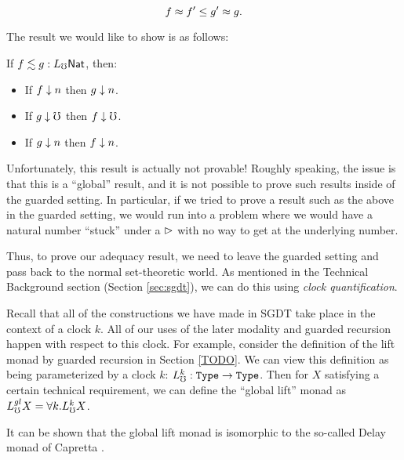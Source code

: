 \[ f \approx f' \le g' \approx g. \]

The result we would like to show is as follows:
\begin{lemma}
If $f \lesssim g : L_\mho \mathsf{Nat}$, then:
\begin{itemize}
  \item If $f \downarrow n$ then $g \downarrow n$.
  \item If $g \downarrow \mho$ then $f \downarrow \mho$.
  \item If $g \downarrow n$ then $f \downarrow n$.
\end{itemize}
\end{lemma}

Unfortunately, this result is actually not provable!
Roughly speaking, the issue is that this is a ``global'' result, and it is not possible
to prove such results inside of the guarded setting. 
In particular, if we tried to prove a result such as the above in the guarded setting,
we would run into a problem where we would have a natural number ``stuck'' under a $\vartriangleright$
with no way to get at the underlying number.

Thus, to prove our adequacy result, we need to leave the guarded setting and pass back
to the normal set-theoretic world.
As mentioned in the Technical Background section (Section \ref{sec:sgdt}), we can do this
using \emph{clock quantification}.

Recall that all of the constructions we have made in SGDT take place in the context of a clock $k$.
All of our uses of the later modality and guarded recursion happen with respect to this clock.
For example, consider the definition of the lift monad by guarded recursion in Section \ref{TODO}.
We can view this definition as being parameterized by a clock $k$: $L_\mho^k : \texttt{Type} \to \texttt{Type}$.
Then for $X$ satisfying a certain technical requirement, we can define the ``global lift'' monad as $L_\mho^{gl} X = \forall k. L_\mho^k X$.


It can be shown that the global lift monad is isomorphic to the so-called Delay monad of Capretta \cite{TODO}.



